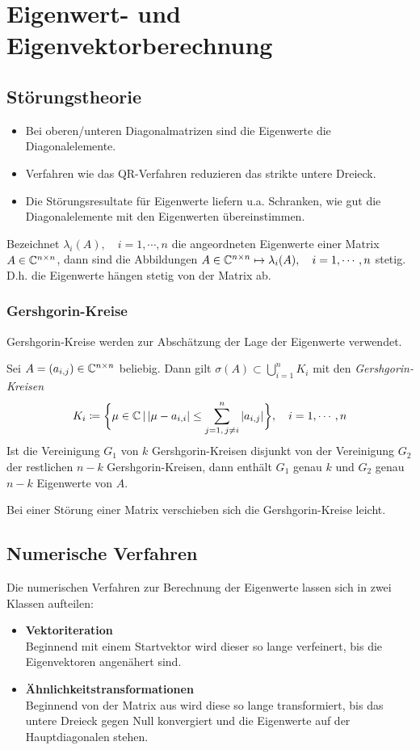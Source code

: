 \chapter{Eigenwert- und Eigenvektorberechnung}
	\section{Störungstheorie}
		\begin{itemize}
			\item Bei oberen/unteren Diagonalmatrizen sind die Eigenwerte die Diagonalelemente.
			\item Verfahren wie das QR-Verfahren reduzieren das strikte untere Dreieck.
			\item Die Störungsresultate für Eigenwerte liefern u.a. Schranken, wie gut die Diagonalelemente mit den Eigenwerten übereinstimmen.
		\end{itemize}

		Bezeichnet \( \lambda_i(A), \quad i = 1, \cdots, n \) die angeordneten Eigenwerte einer Matrix \( A \in \mathbb{C}^{n \times n} \), dann sind die Abbildungen \( A \in \mathbb{C}^{n \times n} \mapsto \lambda_i(A), \quad i = 1, \cdots, n \) stetig. D.h. die Eigenwerte hängen stetig von der Matrix ab.

		\subsection{Gershgorin-Kreise}
			Gershgorin-Kreise werden zur Abschätzung der Lage der Eigenwerte verwendet.

			Sei \( A = (a_{i,j}) \in \mathbb{C}^{n \times n} \) beliebig. Dann gilt \( \sigma(A) \subset \bigcup_{i=1}^n K_i \) mit den \textit{Gershgorin-Kreisen}
			\begin{equation*}
				K_i \coloneqq \bigg\{ \mu \in \mathbb{C} \,\vert\, \abs{\mu - a_{i,i}} \leq \sum_{j = 1,\, j \neq i}^{n} \abs{a_{i,j}} \bigg\}, \quad i = 1, \cdots, n
			\end{equation*}
			Ist die Vereinigung \(G_1\) von \(k\) Gershgorin-Kreisen disjunkt von der Vereinigung \(G_2\) der restlichen \(n-k\) Gershgorin-Kreisen, dann enthält \(G_1\) genau \(k\) und \(G_2\) genau \(n-k\) Eigenwerte von \(A\).

			Bei einer Störung einer Matrix verschieben sich die Gershgorin-Kreise leicht.

	\section{Numerische Verfahren}
		Die numerischen Verfahren zur Berechnung der Eigenwerte lassen sich in zwei Klassen aufteilen:
		\begin{itemize}
			\item \textbf{Vektoriteration} \\ Beginnend mit einem Startvektor wird dieser so lange verfeinert, bis die Eigenvektoren angenähert sind.
			\item \textbf{Ähnlichkeitstransformationen} \\ Beginnend von der Matrix aus wird diese so lange transformiert, bis das untere Dreieck gegen Null konvergiert und die Eigenwerte auf der Hauptdiagonalen stehen.
		\end{itemize}

